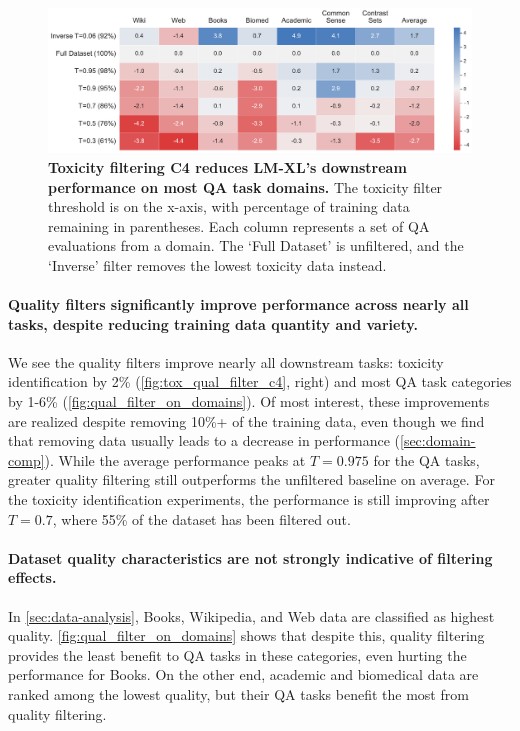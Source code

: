 \documentclass{article}
\newcommand{\bigLM}[0]{\textsc{LM-XL}}
\begin{document}
\begin{figure}[t]
    \centering
    \includegraphics[width=.98\textwidth]{fables/toxicity/toxonly_on_domains_cc.pdf}
    \caption{
    \textbf{Toxicity filtering C4 reduces \bigLM's downstream performance on most QA task domains.}
    The toxicity filter threshold is on the x-axis, with percentage of training data remaining in parentheses. 
    Each column represents a set of QA evaluations from a domain.
    The `Full Dataset' is unfiltered, and the `Inverse' filter removes the lowest toxicity data instead.
    }
    \label{fig:tox_filter_on_domains}
\end{figure}

\vspace{-3mm}
\paragraph{Quality filters significantly improve performance across nearly all tasks, despite reducing training data quantity and variety.}
We see the quality filters improve nearly all downstream tasks: toxicity identification by 2\% (\cref{fig:tox_qual_filter_c4}, right) and most QA task categories by 1-6\% (\cref{fig:qual_filter_on_domains}).
Of most interest, these improvements are realized despite removing 10\%+ of the training data, even though we find that removing data usually leads to a decrease in performance (\cref{sec:domain-comp}).
While the average performance peaks at $T=0.975$ for the QA tasks, greater quality filtering still outperforms the unfiltered baseline on average.
For the toxicity identification experiments, the performance is still improving after $T=0.7$, where 55\% of the dataset has been filtered out.

\vspace{-3mm}
\paragraph{Dataset quality characteristics are not strongly indicative of filtering effects.}
In \cref{sec:data-analysis}, Books, Wikipedia, and Web data are classified as highest quality.
\cref{fig:qual_filter_on_domains} shows that despite this, quality filtering provides the least benefit to QA tasks in these categories, even hurting the performance for Books.
On the other end, academic and biomedical data are ranked among the lowest quality, but their QA tasks benefit the most from quality filtering.
\end{document}
